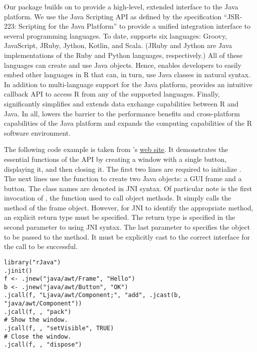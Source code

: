 Our  package builds on  to provide a high-level, extended interface to the Java platform. We use the Java Scripting API \citep{jsa} as defined by the specification “JSR-223: Scripting for the Java Platform” \citep{jsr223spec} to provide a unified integration interface to several programming languages. To date,  supports six languages: Groovy, JavaScript, JRuby, Jython, Kotlin, and Scala. (JRuby and Jython are Java implementations of the Ruby and Python languages, respectively.) All of these languages can create and use Java objects. Hence,  enables developers to easily embed other languages in R that can, in turn, use Java classes in natural syntax. In addition to multi-language support for the Java platform,  provides an intuitive callback API to access R from any of the supported languages. Finally,  significantly simplifies and extends data exchange capabilities between R and Java. In all,  lowers the barrier to the performance benefits and cross-platform capabilities of the Java platform and expands the computing capabilities of the R software environment.

The following code example is taken from 's \href{http://www.rforge.net/rJava/}{web site}. It demonstrates the essential functions of the  API by creating a window with a single button, displaying it, and then closing it. The first two lines are required to initialize . The next lines use the  function to create two Java objects: a GUI frame and a button. The class names are denoted in JNI syntax. Of particular note is the first invocation of , the function used to call object methods. It simply calls the  method of the frame object. However, for JNI to identify the appropriate method, an explicit return type must be specified. The return type is specified in the second parameter to  using JNI syntax. The last parameter to  specifies the object to be passed to the  method. It must be explicitly cast to the correct interface for the call to be successful.

\begin{verbatim}
library("rJava")
.jinit()
f <- .jnew("java/awt/Frame", "Hello")
b <- .jnew("java/awt/Button", "OK")
.jcall(f, "Ljava/awt/Component;", "add", .jcast(b, "java/awt/Component"))
.jcall(f, , "pack")
# Show the window.
.jcall(f, , "setVisible", TRUE)
# Close the window.
.jcall(f, , "dispose")
\end{verbatim}

